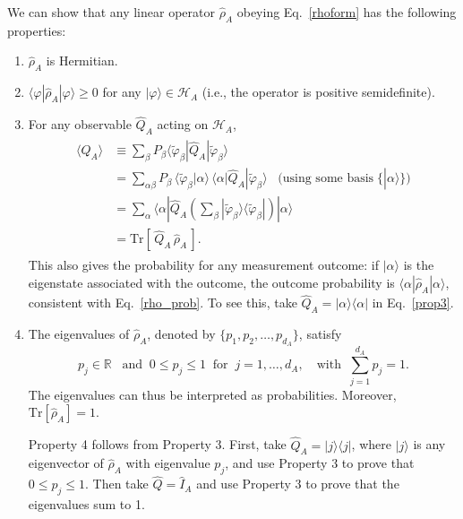 \documentclass[pra,12pt]{revtex4-2}
\begin{document}
We can show that any linear operator $\hat{\rho}_A$ obeying
Eq.~\eqref{rhoform} has the following properties:
\begin{enumerate}
\item $\hat{\rho}_A$ is Hermitian.

\item $\langle\varphi|\hat{\rho}_A|\varphi\rangle \ge 0$ for any
  $|\varphi\rangle \in \mathscr{H}_A$ (i.e., the operator is positive
  semidefinite).

\item For any observable $\hat{Q}_A$ acting on $\mathscr{H}_A$,
  \begin{align}
    \begin{aligned}
      \langle Q_A \rangle
      &\equiv \sum_\beta P_\beta
      \langle \tilde{\varphi}_\beta|\hat{Q}_A|\tilde{\varphi}_\beta\rangle \\
      &= \sum_{\alpha\beta} P_\beta\,
      \langle \tilde{\varphi}_\beta|\alpha\rangle \,
      \langle\alpha|\hat{Q}_A|\tilde{\varphi}_\beta\rangle
      \;\;\;\big(\textrm{using some basis} \;\{|\alpha\rangle\}\big) \\
      &= \sum_\alpha
      \langle\alpha|\hat{Q}_A \left(\sum_\beta |\tilde{\varphi}_\beta\rangle
      \langle \tilde{\varphi}_\beta|\right) |\alpha\rangle \\
      &= \mathrm{Tr}\left[\,\hat{Q}_A \,\hat{\rho}_A\,\right].
    \end{aligned}
    \label{prop3}
  \end{align}
  This also gives the probability for any measurement outcome: if
  $|\alpha\rangle$ is the eigenstate associated with the outcome, the
  outcome probability is $\langle\alpha|\hat\rho_A|\alpha\rangle$,
  consistent with Eq.~\eqref{rho_prob}.  To see this, take $\hat{Q}_A
  = |\alpha\rangle \langle \alpha|$ in Eq.~\eqref{prop3}.
  
\item The eigenvalues of $\hat{\rho}_A$, denoted by $\{p_1, p_2,
  \dots, p_{d_A}\}$, satisfy
  \begin{equation}
    p_j \in \mathbb{R} \;\;\;\mathrm{and}\;\; 0 \le p_j \le 1 \;\;
    \mathrm{for}\;\; j = 1,\dots,d_A,
    \quad\mathrm{with}\;\; \sum_{j=1}^{d_A} p_j = 1.
    \label{trrho_reduced}    
  \end{equation}
  The eigenvalues can thus be interpreted as probabilities.  Moreover,
  $\mathrm{Tr}[\hat\rho_A] = 1$.

  Property 4 follows from Property 3.  First, take $\hat{Q}_A =
  |j\rangle\langle j|$, where $|j\rangle$ is any eigenvector of
  $\hat\rho_A$ with eigenvalue $p_j$, and use Property 3 to prove that
  $0 \le p_j \le 1$.  Then take $\hat{Q} = \hat{I}_A$ and use Property
  3 to prove that the eigenvalues sum to 1.
\end{enumerate}
\end{document}

